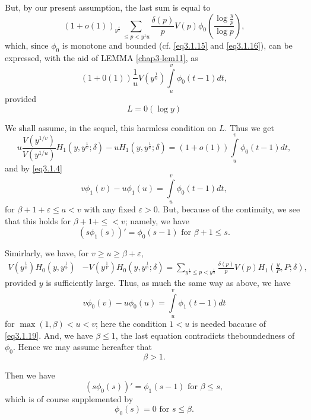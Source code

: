But, by our present assumption, the last sum is equal to 
$$
(1+ o (1))_{y^{\frac{v}{1}}} \sum _{\le p < y^{1}{u}}
\frac{\delta{(p)}}{p} V(p) \phi_0 \left(\frac {\log \frac{y}{p}} {\log
  p}\right),  
$$
which, since $\phi _0$ is monotone and bounded (cf. \eqref{eq3.1.15} and
\eqref{eq3.1.16}), can be expressed, with the aid of LEMMA
\ref{chap3-lem11}, as  
$$
(1+0(1))\frac{1}{u} V (y^{\frac{1}{u}}) \int \limits ^v_u \phi_0 (t-1)dt,
$$
provided
\begin{equation*}
  L=0 (\log y) \tag{3.1.20}\label{eq3.1.20}
\end{equation*}\pageoriginale

We shall assume, in the sequel, this harmless condition on $L$. Thus we get
$$
u \frac{V(y^{1/v})}{V(y^{1/u})} H_1 (y,y^{\frac {1}{v}}; \delta)- u
H_1 (y,y^{\frac {1}{v}}; \delta) = (1+o(1)) { \int\limits ^v_u} \phi_0
(t-1)dt, 
$$
and by \eqref{eq3.1.4}
$$
v \phi _1 (v)-u \phi_1(u)= {\int \limits_u^v} \phi _0 (t-1)dt,
$$
for $\beta +1+ \varepsilon \le a<v$ with any fixed $\varepsilon >
0$. But, because of 
the continuity, we see that this holds for $\beta +1+  \le <v$;
namely, we have 
\begin{equation*}
  (s \phi_1 (s))' = \phi_0 (s-1) \text{ for } \beta +1 \le
  s. \tag{3.1.21}\label{eq3.1.21} 
\end{equation*}

Simirlarly, we have, for $v \ge u \ge \beta + \varepsilon$,
\begin{align*} 
  V (y^{\frac{1}{v}}) H_0(y,y^{\frac{1}{v}}) & - V(y^{\frac{1}{V}}) H_0
  (y,y^{\frac{1}{v}}; \delta) 
  = \sum_{y^{\frac{1}{v}}\leq p< y^{\frac{1}{u}}}
  \frac{\delta{(p)}}{p}V(p)H_1 \left(\frac{y}{P},P; \delta\right),  
\end{align*}
provided $y$ is sufficiently large. Thus, as much the same way as above, we have
$$
v \phi_0 (v)-u \phi_0 (u)= \int \limits ^v_u \phi_1 (t-1)dt
$$
for $\max (1, \beta)<u<v$; here the condition $1 < u$ is needed
bacause of \eqref{eq3.1.19}. And, we have $\beta \le 1$, the last equation
contradicts the\pageoriginale boundedness of $\phi_0$. Hence we may
assume hereafter that 
\begin{equation*}
  \beta >1. \tag{3.1.22}\label{eq3.1.22}
\end{equation*}

Then we have 
\begin{equation*}
  (s\phi_0 (s))' = \phi_1 (s-1) \text{ for } \beta \le s,
  \tag{3.1.23}\label{eq3.1.23} 
\end{equation*}
which is of course supplemented by
\begin{equation*}
  \phi_0(s)=0 \text{ for } s \le \beta. \tag{3.1.24}\label{eq3.1.24}
\end{equation*}

